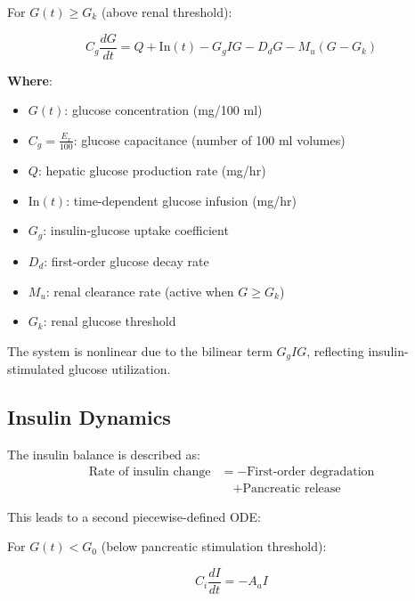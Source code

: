 \documentclass[conference]{IEEEtran}
\begin{document}
For $G(t) \geq G_k$ (above renal threshold):

\begin{equation}
    C_g \frac{dG}{dt} = Q + \mathrm{In}(t) - G_g I G - D_d G - M_u (G - G_k)
    \label{eq:glucose_above_threshold}
\end{equation}

\noindent \textbf{Where}:

\begin{itemize}
    \item $G(t)$: glucose concentration (mg/100 ml)
    \item $C_g = \frac{E_x}{100}$: glucose capacitance (number of 100 ml volumes)
    \item $Q$: hepatic glucose production rate (mg/hr)
    \item $\mathrm{In}(t)$: time-dependent glucose infusion (mg/hr)
    \item $G_g$: insulin-glucose uptake coefficient
    \item $D_d$: first-order glucose decay rate
    \item $M_u$: renal clearance rate (active when $G \geq G_k$)
    \item $G_k$: renal glucose threshold
\end{itemize}

The system is nonlinear due to the bilinear term $G_g I G$, reflecting insulin-stimulated glucose utilization.

\subsection{Insulin Dynamics}

The insulin balance is described as:
\begin{equation}
\begin{split}
\text{Rate of insulin change} &= - \text{First-order degradation} \\
                              &\quad + \text{Pancreatic release}
\end{split}
\end{equation}

This leads to a second piecewise-defined ODE:

For $G(t) < G_0$ (below pancreatic stimulation threshold):

\begin{equation}
    C_i \frac{dI}{dt} = -A_a I
    \label{eq:insulin_below_threshold}
\end{equation}
\end{document}
